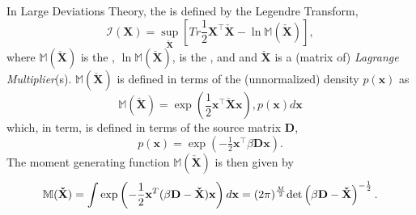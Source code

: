 In Large Deviations Theory, the \RateFunction is defined by the Legendre Transform,
\begin{equation}
\label{eqn:rate-fun}
    \mathcal{I}(\mathbf{X})=\underset{\mathbf{\check{X}}}{\sup}
    \left[Tr\dfrac{1}{2}\mathbf{{X}}^{\top}\mathbf{\check{X}}-\ln\mathbb{M}(\mathbf{\check{X}})\right]  ,
\end{equation}
where $\mathbb{M}(\mathbf{\check{X}})$ is the \MomentGeneratingFunction,
$\ln\mathbb{M}(\mathbf{\check{X}})$, is the \CumulantGeneratingFunction, and
and $\mathbf{\check{X}}$ is a (matrix of) \emph{Lagrange Multiplier}(s).  $\mathbb{M}(\mathbf{\check{X}})$ is defined in terms of the (unnormalized) density $p(\mathbf{x})$ as
\begin{equation}
\label{eqn:rate_function}
   \mathbb{M}(\mathbf{\check{X}})=\exp\left(\frac{1}{2}\mathbf{x}^{\top}\mathbf{\check{X}}\mathbf{x}\right)  ,
  p(\mathbf{x})d\mathbf{x}
\end{equation}
which, in term, is defined in terms of the source matrix $\mathbf{D}$,
\begin{equation}
\label{eqn:X_density}
p(\mathbf{x})=\exp\left(-\tfrac{1}{2}\mathbf{x}^{\top}\beta\mathbf{D}\mathbf{x}\right)  .
\end{equation}
%
The moment generating function $ \mathbb{M}(\mathbf{\check{X}})$ is then given by
%
\begin{equation}
\mathbb{M}(\mathbf{\check{X}}) 
   = \int \exp\left(-\frac{1}{2}\mathbf{x}^T(\beta\mathbf{D} - \mathbf{\check{X}})\mathbf{x}\right) d\mathbf{x} 
   = (2\pi)^{\frac{M}{2}} \mbox{}{\text{det}}\left(\beta\mathbf{D} - \mathbf{\check{X}}\right)^{-\frac{1}{2}}  .
\end{equation}

